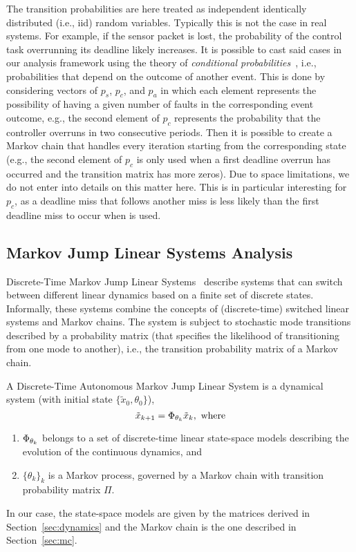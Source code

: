 The transition probabilities are here treated as independent identically distributed (i.e., iid) random variables.
Typically this is not the case in real systems.
For example, if the sensor packet is lost, the probability of the control task overrunning its deadline likely increases.
It is possible to cast said cases in our analysis framework using the theory of \emph{conditional probabilities}~\cite{Dekking:2006}, i.e., probabilities that depend on the outcome of another event.
This is done by considering vectors of $p_s$, $p_c$, and $p_a$ in which each element represents the possibility of having a given number of faults in the corresponding event outcome, e.g., the second element of $p_c$ represents the probability that the controller overruns in two consecutive periods.
Then it is possible to create a Markov chain that handles every iteration starting from the corresponding state (e.g., the second element of $p_c$ is only used when a first deadline overrun has occurred and the transition matrix has more zeros).
Due to space limitations, we do not enter into details on this matter here.
This is in particular interesting for $p_c$, as a deadline miss that follows another miss is less likely than the first deadline miss to occur when \tS{} is used.

\subsection{Markov Jump Linear Systems Analysis}%
\label{sec:mjls}%
%
Discrete-Time Markov Jump Linear Systems~\cite{Costa:2005} describe systems that can switch between different linear dynamics based on a finite set of discrete states.
Informally, these systems combine the concepts of (discrete-time) switched linear systems and Markov chains.
The system is subject to stochastic mode transitions described by a probability matrix (that specifies the likelihood of transitioning from one mode to another), i.e., the transition probability matrix of a Markov chain.
%
\begin{definition}%
    \label{def:mjls}%
    A Discrete-Time Autonomous Markov Jump Linear System is a dynamical system (with initial state $\{\tilde{x}_0, \theta_0\}$),
    \begin{equation*}
        \tilde{x}_{k+1} = \Phi_{\theta_k} \tilde{x}_k,\text{  where}
    \end{equation*}
    \begin{enumerate}[label=(\roman*)]
        \item $\Phi_{\theta_k}$ belongs to a set of discrete-time linear state-space models describing the evolution of the continuous dynamics, and
        \item $\{\theta_k\}_k$ is a Markov process, governed by a Markov chain with transition probability matrix $\Pi$.
    \end{enumerate}
\end{definition}
%
In our case, the state-space models are given by the matrices derived in Section~\ref{sec:dynamics} and the Markov chain is the one described in Section~\ref{sec:mc}.

